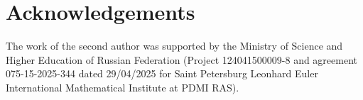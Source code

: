 \documentclass[11pt,a4paper]{article}
\begin{document}
\section*{Acknowledgements}

The work of the second author was supported by the Ministry of Science and Higher Education of Russian Federation (Project 124041500009-8 and agreement 075-15-2025-344 dated 29/04/2025 for Saint Petersburg Leonhard Euler International Mathematical Institute at PDMI RAS).




\end{document}
